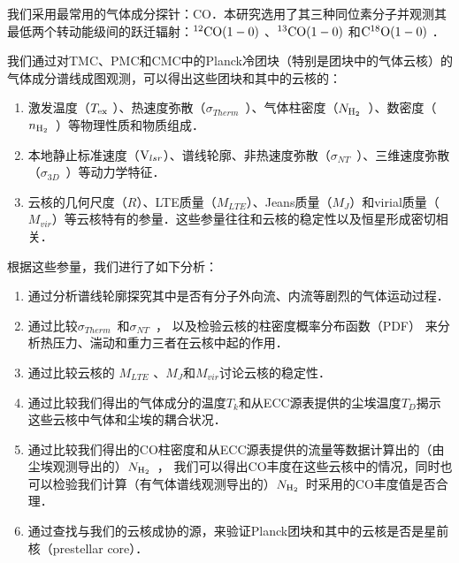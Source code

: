 \documentclass[UTF8, nocolorlinks]{pkuthss}
\newcommand{\coaa}{$\rm^{12}CO(1-0)$ }
\newcommand{\cobb}{$\rm^{13}CO(1-0)$ }
\newcommand{\cocc}{$\rm C^{18}O(1-0)$ }
\newcommand{\vlsr}{${\rm V } _{lsr}$}
\newcommand{\texc}{$T_{\rm {ex}}$ }
\newcommand{\nhyd}{$N_{\rm H_2}$\ }
\newcommand{\nnhyd}{$n_{\rm H_2}$\ }
\newcommand{\sigmath}{$\sigma _{Therm}$\ }
\newcommand{\sigmant}{$\sigma _{NT}$\ }
\newcommand{\sigmatd}{$\sigma _{3D}$\ }
\begin{document}
		我们采用最常用的气体成分探针：CO．本研究选用了其三种同位素分子并观测其最低两个转动能级间的跃迁辐射：\coaa 、\cobb  和\cocc ．

		我们通过对TMC、PMC和CMC中的Planck冷团块（特别是团块中的气体云核）的气体成分谱线成图观测，可以得出这些团块和其中的云核的：

		\begin{enumerate}
			\item 激发温度（\texc ）、热速度弥散（\sigmath ）、气体柱密度（\nhyd ）、数密度（\nnhyd ）等物理性质和物质组成．

			\item 本地静止标准速度（\vlsr ）、谱线轮廓、非热速度弥散（\sigmant ）、三维速度弥散（\sigmatd ）等动力学特征．

			\item 云核的几何尺度（$R$）、LTE质量（$M_{LTE}$）、Jeans质量（$M_{J}$）和virial质量（$M_{vir}$）等云核特有的参量．这些参量往往和云核的稳定性以及恒星形成密切相关．
		\end{enumerate}
		
		根据这些参量，我们进行了如下分析：

		\begin{enumerate}
			\item 通过分析谱线轮廓探究其中是否有分子外向流、内流等剧烈的气体运动过程．

			\item 通过比较\sigmath 和\sigmant ， 以及检验云核的柱密度概率分布函数（PDF） 来分析热压力、湍动和重力三者在云核中起的作用．

			\item 通过比较云核的 $M_{LTE}$ 、$M_{J}$和$M_{vir}$讨论云核的稳定性．

			\item 通过比较我们得出的气体成分的温度$T_k$和从ECC源表提供的尘埃温度$T_D$揭示这些云核中气体和尘埃的耦合状况．

			\item 通过比较我们得出的CO柱密度和从ECC源表提供的流量等数据计算出的（由尘埃观测导出的）\nhyd， 我们可以得出CO丰度在这些云核中的情况，同时也可以检验我们计算（有气体谱线观测导出的）\nhyd 时采用的CO丰度值是否合理．

			\item 通过查找与我们的云核成协的源，来验证Planck团块和其中的云核是否是星前核（prestellar core）．
		\end{enumerate}
\end{document}
